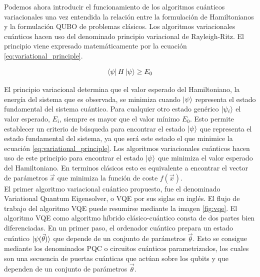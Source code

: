 Podemos ahora introducir el funcionamiento de los algoritmos cuánticos variacionales una vez entendida la relación entre la formulación de Hamiltonianos y la formulación  QUBO de problemas clásicos. Los algoritmos variacionales cuánticos hacen uso del denominado principio variacional de Rayleigh-Ritz. El principio viene expresado matemáticamente por la ecuación \ref{eq:variational_principle}.

\begin{equation}
    \bra{\psi} H \ket{\psi} \geq E_{0}
    \label{eq:variational_principle}
\end{equation}

El principio variacional determina que el valor esperado del Hamiltoniano, la energía del sistema que es observada, se minimiza cuando $\ket{\psi}$ representa el estado fundamental del sistema cuántico. Para cualquier otro estado genérico $\ket{\psi_{i}}$ el valor esperado, $E_{i}$, siempre es mayor que el valor mínimo $E_{0}$. Esto permite establecer un criterio de búsqueda para encontrar el estado $\ket{\psi}$ que representa el estado fundamental del sistema, ya que será este estado el que minimice la ecuación \ref{eq:variational_principle}. Los algoritmos variacionales cuánticos hacen uso de este principio para encontrar el estado $\ket{\psi}$ que minimiza el valor esperado del Hamiltoniano. En terminos clásicos esto es equivalente a encontrar el vector de parámetros $\Vec{x}$ que minimiza la función de coste $f(\Vec{x})$. \\

El primer algoritmo variacional cuántico propuesto, fue el denominado  Variational Quantum Eigensolver, o VQE \citep{peruzzo} por sus siglas en inglés. El flujo de trabajo del algoritmo VQE puede resumirse mediante la imagen \ref{fig:vqe}. El algoritmo VQE como algoritmo híbrido clásico-cuántico consta de dos partes bien diferenciadas. En un primer paso, el ordenador cuántico prepara un estado cuántico $\ket{\psi(\Vec{\theta})}$ que depende de un conjunto de parámetros $\Vec{\theta}$. Esto se consigue mediante los denominados PQC o circuitos cuánticos parametrizados, los cuales son una secuencia de puertas cuánticas que actúan sobre los qubits y que dependen de un conjunto de parámetros $\Vec{\theta}$.

\newpage

